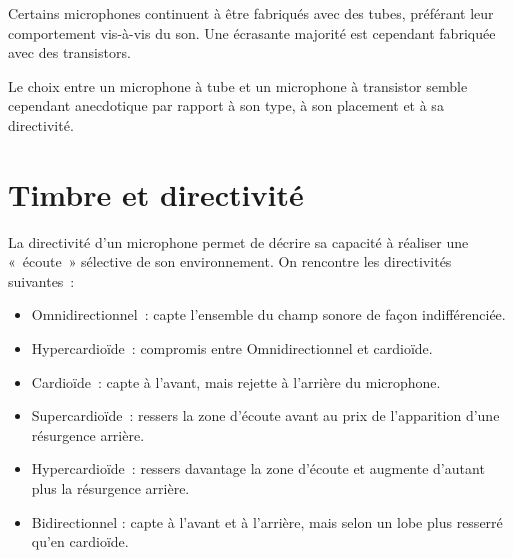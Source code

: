 \documentclass[
  letterpaper,
  DIV=11,
  numbers=noendperiod]{scrreprt}
\providecommand{\tightlist}{%
  \setlength{\itemsep}{0pt}\setlength{\parskip}{0pt}}\usepackage{longtable,booktabs,array}
\begin{document}
Certains microphones continuent à être fabriqués avec des tubes,
préférant leur comportement vis-à-vis du son. Une écrasante majorité est
cependant fabriquée avec des transistors.

Le choix entre un microphone à tube et un microphone à transistor semble
cependant anecdotique par rapport à son type, à son placement et à sa
directivité.

\hypertarget{timbre-et-directivituxe9}{%
\section{Timbre et directivité}\label{timbre-et-directivituxe9}}

La directivité d'un microphone permet de décrire sa capacité à réaliser
une «~écoute~» sélective de son environnement. On rencontre les
directivités suivantes~:

\begin{itemize}
\tightlist
\item
  Omnidirectionnel~: capte l'ensemble du champ sonore de façon
  indifférenciée.
\item
  Hypercardioïde~: compromis entre Omnidirectionnel et cardioïde.
\item
  Cardioïde~: capte à l'avant, mais rejette à l'arrière du microphone.
\item
  Supercardioïde~: ressers la zone d'écoute avant au prix de
  l'apparition d'une résurgence arrière.
\item
  Hypercardioïde~: ressers davantage la zone d'écoute et augmente
  d'autant plus la résurgence arrière.
\item
  Bidirectionnel : capte à l'avant et à l'arrière, mais selon un lobe
  plus resserré qu'en cardioïde.
\end{itemize}
\end{document}
